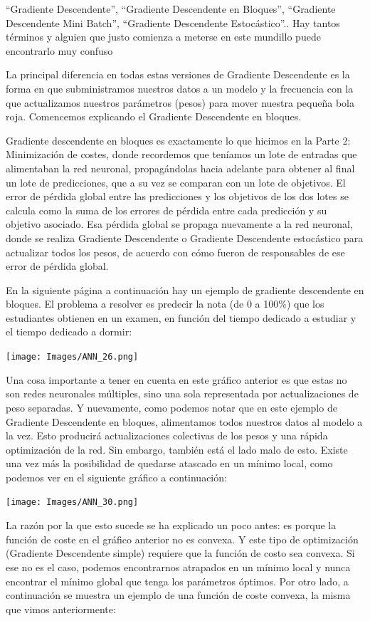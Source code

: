 \documentclass[
]{book}
\begin{document}
``Gradiente Descendente'', ``Gradiente Descendente en Bloques'', ``Gradiente Descendente Mini Batch'', ``Gradiente Descendente Estocástico''.. Hay tantos términos y alguien que justo comienza a meterse en este mundillo puede encontrarlo muy confuso

La principal diferencia en todas estas versiones de Gradiente Descendente es la forma en que subministramos nuestros datos a un modelo y la frecuencia con la que actualizamos nuestros parámetros (pesos) para mover nuestra pequeña bola roja. Comencemos explicando el Gradiente Descendente en bloques.

Gradiente descendente en bloques es exactamente lo que hicimos en la Parte 2: Minimización de costes, donde recordemos que teníamos un lote de entradas que alimentaban la red neuronal, propagándolas hacia adelante para obtener al final un lote de predicciones, que a su vez se comparan con un lote de objetivos. El error de pérdida global entre las predicciones y los objetivos de los dos lotes se calcula como la suma de los errores de pérdida entre cada predicción y su objetivo asociado. Esa pérdida global se propaga nuevamente a la red neuronal, donde se realiza Gradiente Descendente o Gradiente Descendente estocástico para actualizar todos los pesos, de acuerdo con cómo fueron de responsables de ese error de pérdida global.

En la siguiente página a continuación hay un ejemplo de gradiente descendente en bloques. El problema a resolver es predecir la nota (de 0 a 100\%) que los estudiantes obtienen en un examen, en función del tiempo dedicado a estudiar y el tiempo dedicado a dormir:

\texttt{[image: Images/ANN\_26.png]}

Una cosa importante a tener en cuenta en este gráfico anterior es que estas no son redes neuronales múltiples, sino una sola representada por actualizaciones de peso separadas. Y nuevamente, como podemos notar que en este ejemplo de Gradiente Descendente en bloques, alimentamos todos nuestros datos al modelo a la vez. Esto producirá actualizaciones colectivas de los pesos y una rápida optimización de la red. Sin embargo, también está el lado malo de esto. Existe una vez más la posibilidad de quedarse atascado en un mínimo local, como podemos ver en el siguiente gráfico a continuación:

\texttt{[image: Images/ANN\_30.png]}

La razón por la que esto sucede se ha explicado un poco antes: es porque la función de coste en el gráfico anterior no es convexa. Y este tipo de optimización (Gradiente Descendente simple) requiere que la función de costo sea convexa. Si ese no es el caso, podemos encontrarnos atrapados en un mínimo local y nunca encontrar el mínimo global que tenga los parámetros óptimos. Por otro lado, a continuación se muestra un ejemplo de una función de coste convexa, la misma que vimos anteriormente:
\end{document}
